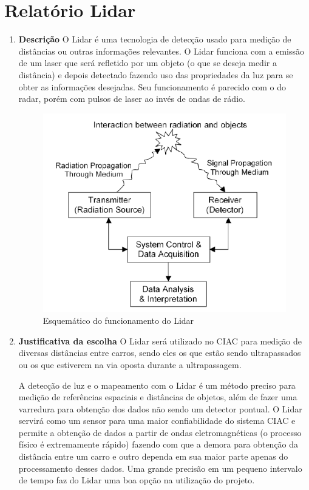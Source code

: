 \chapter[Relatório Lidar]{Relatório Lidar}
\begin{enumerate}
\item \textbf{Descrição}
O Lidar é uma tecnologia de detecção usado para medição de distâncias ou
outras informações relevantes. O Lidar funciona com a emissão de um laser
que será refletido por um objeto (o que se deseja medir a distância) e depois
detectado fazendo uso das propriedades da luz para se obter as informações
desejadas. Seu funcionamento é parecido com o do radar, porém com pulsos de
laser ao invés de ondas de rádio.


\begin{figure}[h]
  \centering
  \includegraphics[width=400px, scale=1]{figuras/funcionamento_lidar}
  \caption{Esquemático do funcionamento do Lidar}
\label{fig:funcionamento_lidar}
\end{figure}

\item \textbf{Justificativa da escolha}
O Lidar será utilizado no CIAC para medição de diversas distâncias entre carros,
sendo eles os que estão sendo ultrapassados ou os que estiverem na via oposta
durante a ultrapassagem.

	A detecção de luz e o mapeamento com o Lidar é um método preciso para medição
  de referências espaciais e distâncias de objetos, além de fazer uma varredura
  para obtenção dos dados não sendo um detector pontual. O Lidar servirá como um
  sensor para uma maior confiabilidade do sistema CIAC e permite a obtenção de dados
  a partir de ondas eletromagnéticas (o processo físico é extremamente rápido)
  fazendo com que a demora para obtenção da distância entre um carro e outro
  dependa em sua maior parte apenas do processamento desses dados. Uma grande
  precisão em um pequeno intervalo de tempo faz do Lidar uma boa opção
  na utilização do projeto.


\end{enumerate}
